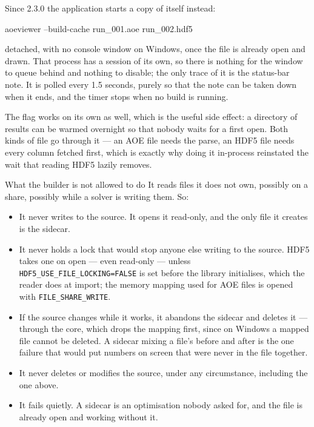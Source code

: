 \documentclass[11pt,a4paper,oneside]{report}
\newcommand{\appver}{2.3.0}
\newcommand{\code}[1]{\texttt{#1}}
\begin{document}
Since \appver{} the application starts a copy of itself instead:

\begin{aoecode}
aoeviewer --build-cache run_001.aoe run_002.hdf5
\end{aoecode}

detached, with no console window on Windows, once the file is already open and
drawn. That process has a session of its own, so there is nothing for the window
to queue behind and nothing to disable; the only trace of it is the status-bar
note. It is polled every 1.5 seconds, purely so that the note can be taken down
when it ends, and the timer stops when no build is running.

The flag works on its own as well, which is the useful side effect: a directory
of results can be warmed overnight so that nobody waits for a first open. Both
kinds of file go through it --- an AOE file needs the parse, an HDF5 file needs
every column fetched first, which is exactly why doing it in-process reinstated
the wait that reading HDF5 lazily removes.

\begin{aoenote}{What the builder is not allowed to do}
It reads files it does not own, possibly on a share, possibly while a solver is
writing them. So:

\begin{itemize}
  \item It never writes to the source. It opens it read-only, and the only file
        it creates is the sidecar.
  \item It never holds a lock that would stop anyone else writing to the
        source. HDF5 takes one on open --- even read-only --- unless
        \code{HDF5\_USE\_FILE\_LOCKING=FALSE} is set before the library
        initialises, which the reader does at import; the memory mapping used
        for AOE files is opened with \code{FILE\_SHARE\_WRITE}.
  \item If the source changes while it works, it abandons the sidecar and
        deletes it --- through the core, which drops the mapping first, since on
        Windows a mapped file cannot be deleted. A sidecar mixing a file's
        before and after is the one failure that would put numbers on screen
        that were never in the file together.
  \item It never deletes or modifies the source, under any circumstance,
        including the one above.
  \item It fails quietly. A sidecar is an optimisation nobody asked for, and
        the file is already open and working without it.
\end{itemize}
\end{aoenote}
\end{document}
